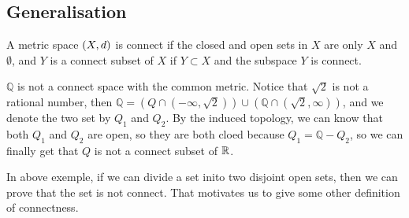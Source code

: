 \documentclass[en,hazy,blue,normal,12pt]{elegantnote}
\begin{document}
\subsection{Generalisation}
\begin{definition}
    A metric space \((X,d)\) is connect if the closed and open sets in \(X\) are only \(X\) and \(\emptyset\), and \(Y\) is a connect subset of \(X\) if \(Y \subset X\) and the subspace \(Y\) is connect.

    \begin{example}
        \(\mathbb{Q}\) is not a connect space with the common metric. Notice that \(\sqrt{2}\) is not a rational number, then \(\mathbb{Q} = (Q \cap (-\infty,\sqrt{2})) \cup (\mathbb{Q} \cap (\sqrt{2},\infty))\), and we denote the two set by \(Q_1\) and \(Q_2\). By the induced topology, we can know that both \(Q_1\) and \(Q_2\) are open, so they are both cloed because \(Q_1 = \mathbb{Q}-Q_2\), so we can finally get that \(Q\) is not a connect subset of \(\mathbb{R}\).
    \end{example}
\end{definition}

In above exemple, if we can divide a set inito two disjoint open sets, then we can prove that the set is not connect. That motivates us to give some other definition of connectness.
\end{document}
